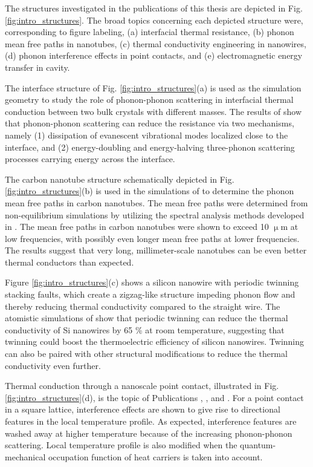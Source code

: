 The structures investigated in the publications of this thesis are depicted in Fig. \ref{fig:intro_structures}. The broad topics concerning each depicted structure were, corresponding to figure labeling, (a) interfacial thermal resistance, (b) phonon mean free paths in nanotubes, (c) thermal conductivity engineering in nanowires, (d) phonon interference effects in point contacts, and (e) electromagnetic energy transfer in cavity. 

The interface structure of Fig. \ref{fig:intro_structures}(a) is used as the simulation geometry to study the role of phonon-phonon scattering in interfacial thermal conduction between two bulk crystals with different masses. The results of  show that phonon-phonon scattering can reduce the resistance via two mechanisms, namely (1) dissipation of evanescent vibrational modes localized close to the interface, and (2) energy-doubling and energy-halving three-phonon scattering processes carrying energy across the interface.  

The carbon nanotube structure schematically depicted in Fig. \ref{fig:intro_structures}(b) is used in the simulations of  to determine the phonon mean free paths in carbon nanotubes. The mean free paths were determined from non-equilibrium simulations by utilizing the spectral analysis methods developed in . The mean free paths in carbon nanotubes were shown to exceed 10 $\upmu$m at low frequencies, with possibly even longer mean free paths at lower frequencies. The results suggest that very long, millimeter-scale nanotubes can be even better thermal conductors than expected. 

Figure \ref{fig:intro_structures}(c) shows a silicon nanowire with periodic twinning stacking faults, which create a zigzag-like structure impeding phonon flow and thereby reducing thermal conductivity compared to the straight wire. The atomistic simulations of  show that periodic twinning can reduce the thermal conductivity of Si nanowires by 65 \% at room temperature, suggesting that twinning could boost the thermoelectric efficiency of silicon nanowires. Twinning can also be paired with other structural modifications to reduce the thermal conductivity even further.

Thermal conduction through a nanoscale point contact, illustrated in Fig. \ref{fig:intro_structures}(d), is the topic of Publications , , and . For a point contact in a square lattice, interference effects are shown to give rise to directional features in the local temperature profile. As expected, interference features are washed away at higher temperature because of the increasing phonon-phonon scattering. Local temperature profile is also modified when the quantum-mechanical occupation function of heat carriers is taken into account. 

